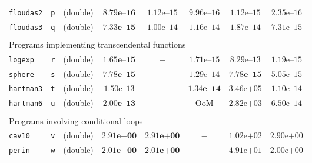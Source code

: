 \begin{tabular}{p{2.3cm}ccccccc}
\multirow{1}{*}{\texttt{floudas2}} & \texttt{p}
& (double) &  $\mathbf{8.79\textbf{e--}16}$ & $1.12\text{e--}15$ & $9.96\text{e--}16$ & $1.12\text{e--}15$ & $2.35\text{e--}16$ \\
\multirow{1}{*}{\texttt{floudas3}} & \texttt{q}
& (double) & $\mathbf{7.33\textbf{e--}15}$ & $1.00\text{e--}14$ & $1.16\text{e--}14$ & $1.87\text{e--}14$ & $7.31\text{e--}15$ \\
\hline
\\
\multicolumn{8}{l}{Programs implementing transcendental functions}\\
\hline
\multirow{1}{*}{\texttt{logexp}} & \texttt{r}
& (double) & $\mathbf{1.65\textbf{e--}15}$ & $-$ & $1.71\text{e--}15$ & $8.29\text{e--}13$ & $1.19\text{e--}15$ \\
\multirow{1}{*}{\texttt{sphere}} & \texttt{s}
& (double) & $\mathbf{7.78\textbf{e--}15}$ & $-$ & $1.29\text{e--}14$ & $\mathbf{7.78\textbf{e--}15}$ & $5.05\text{e--}15$ \\
\multirow{1}{*}{\texttt{hartman3}} & \texttt{t}
& (double) & $1.50\text{e--}13$ & $-$  & $\mathbf{1.34\textbf{e--}14}$ & $3.46\text{e+}05$ & $1.10\text{e--}14$ \\
\multirow{1}{*}{\texttt{hartman6}} & \texttt{u}
& (double) & $\mathbf{2.00\textbf{e--}13}$ & $-$ & $\text{OoM}$ & $2.82\text{e+}03$ & $6.50\text{e--}14$ \\
\hline
\\
\multicolumn{8}{l}{Programs involving conditional loops}    \\
\hline
\multirow{1}{*}{\texttt{cav10}} & \texttt{v}
& (double) & $\mathbf{2.91\textbf{e+}00}$ & $\mathbf{2.91\textbf{e+}00}$ & $-$ & $1.02\text{e+}02$ & $2.90\text{e+}00$ \\
\multirow{1}{*}{\texttt{perin}} & \texttt{w}
& (double) & $\mathbf{2.01\textbf{e+}00}$ & $\mathbf{2.01\textbf{e+}00}$ & $-$ & $4.91\text{e+}01$ & $2.00\text{e+}00$ \\
\hline
\end{tabular}
